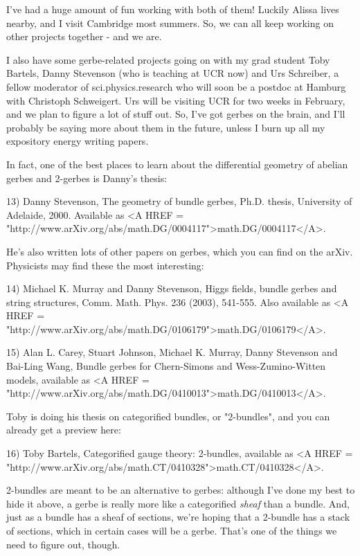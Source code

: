 I've had a huge amount of fun working with both of them!  Luckily Alissa 
lives nearby, and I visit Cambridge most summers.  So, we can all keep 
working on other projects together - and we are.

I also have some gerbe-related projects going on with my grad student
Toby Bartels, Danny Stevenson (who is teaching at UCR now) and Urs 
Schreiber, a fellow moderator of sci.physics.research who will soon be 
a postdoc at Hamburg with Christoph Schweigert.  Urs will be visiting 
UCR for two weeks in February, and we plan to figure a lot of stuff out.
So, I've got gerbes on the brain, and I'll probably be saying more about 
them in the future, unless I burn up all my expository energy writing 
papers.

In fact, one of the best places to learn about the differential geometry 
of abelian gerbes and 2-gerbes is Danny's thesis:

13) Danny Stevenson, The geometry of bundle gerbes, Ph.D. thesis, 
University of Adelaide, 2000.  Available as <A HREF = "http://www.arXiv.org/abs/math.DG/0004117">math.DG/0004117</A>.

He's also written lots of other papers on gerbes, which you can find
on the arXiv.  Physicists may find these the most interesting:

14) Michael K. Murray and Danny Stevenson, Higgs fields, bundle gerbes and
string structures, Comm. Math. Phys. 236 (2003), 541-555.  Also available
as <A HREF = "http://www.arXiv.org/abs/math.DG/0106179">math.DG/0106179</A>.

15) Alan L. Carey, Stuart Johnson, Michael K. Murray, Danny Stevenson
and Bai-Ling Wang, Bundle gerbes for Chern-Simons and Wess-Zumino-Witten
models, available as <A HREF = "http://www.arXiv.org/abs/math.DG/0410013">math.DG/0410013</A>.

Toby is doing his thesis on categorified bundles, or "2-bundles", and
you can already get a preview here:

16) Toby Bartels, Categorified gauge theory: 2-bundles, available as
<A HREF = "http://www.arXiv.org/abs/math.CT/0410328">math.CT/0410328</A>.

2-bundles are meant to be an alternative to gerbes: although I've done
my best to hide it above, a gerbe is really more like a categorified
\emph{sheaf} than a bundle.  And, just as a bundle has a sheaf of
sections, we're hoping that a 2-bundle has a stack of sections, which
in certain cases will be a gerbe.  That's one of the things we need to
figure out, though.

